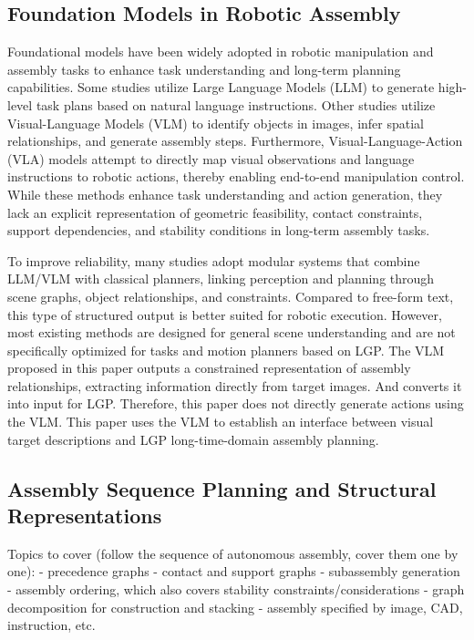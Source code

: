 \documentclass[journal]{IEEEtran}
\begin{document}
\subsection{Foundation Models in Robotic Assembly}
Foundational models have been widely adopted in robotic manipulation and assembly tasks to enhance task understanding and long-term planning capabilities.
Some studies utilize Large Language Models (LLM) to generate high-level task plans based on natural language instructions.
Other studies utilize Visual-Language Models (VLM) to identify objects in images, infer spatial relationships, and generate assembly steps.
Furthermore, Visual-Language-Action (VLA) models attempt to directly map visual observations and language instructions to robotic actions, thereby enabling end-to-end manipulation control.
While these methods enhance task understanding and action generation, they lack an explicit representation of geometric feasibility, contact constraints, support dependencies, and stability conditions in long-term assembly tasks.

To improve reliability, many studies adopt modular systems that combine LLM/VLM with classical planners, linking perception and planning through scene graphs, object relationships, and constraints.
Compared to free-form text, this type of structured output is better suited for robotic execution.
However, most existing methods are designed for general scene understanding and are not specifically optimized for tasks and motion planners based on LGP.
The VLM proposed in this paper outputs a constrained representation of assembly relationships, extracting information directly from target images.
And converts it into input for LGP.
Therefore, this paper does not directly generate actions using the VLM.
This paper uses the VLM to establish an interface between visual target descriptions and LGP long-time-domain assembly planning.


\subsection{Assembly Sequence Planning and Structural Representations}

Topics to cover (follow the sequence of autonomous assembly, cover them one by one):
- precedence graphs
- contact and support graphs
- subassembly generation
- assembly ordering, which also covers stability constraints/considerations
- graph decomposition for construction and stacking
- assembly specified by image, CAD, instruction, etc.
\end{document}
